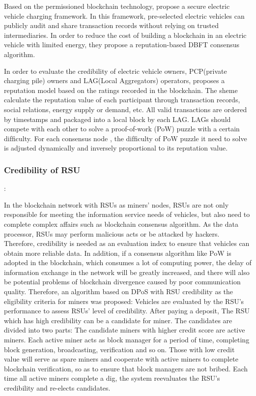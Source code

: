 Based on the permissioned blockchain technology, \cite{ref50} propose a secure electric vehicle charging framework. In this framework, pre-selected electric vehicles can publicly audit and share transaction records without relying on trusted intermediaries. In order to reduce the cost of building a blockchain in an electric vehicle with limited energy, they propose a reputation-based DBFT consensus algorithm.

In order to evaluate the credibility of electric vehicle owners, PCP(private charging pile) owners and LAG(Local Aggregators) operators, \cite{ref59} proposes a reputation model based on the ratings recorded in the blockchain. The sheme calculate the reputation value of each participant through transaction records, social relations, energy supply or demand, etc. All valid transactions are ordered by timestamps and packaged into a local block by each LAG. LAGs should compete with each other to solve a proof-of-work (PoW) puzzle with a certain difﬁculty. For each consensus node , the difﬁculty of PoW puzzle it need to solve is adjusted dynamically and inversely proportional to its reputation value.

\subsubsection{\bf Credibility of RSU}:

In the blockchain network with RSUs as miners' nodes, RSUs are not only responsible for meeting the information service needs of vehicles, but also need to complete complex affairs such as blockchain consensus algorithm.  As the data processor, RSUs may perform malicious acts or be attacked by hackers. Therefore, credibility is needed as an evaluation index to ensure that vehicles can obtain more reliable data. In addition, if a consensus algorithm like PoW is adopted in the blockchain, which consumes a lot of computing power, the delay of information exchange in the network will be greatly increased, and there will also be potential problems of blockchain divergence caused by poor communication quality. Therefore, an algorithm based on DPoS with RSU credibility as the eligibility criteria for miners was proposed: Vehicles are evaluated by the RSU's performance to assess RSUs' level of credibility. After paying a deposit, The RSU which has high credibility can be a candidate for miner. The candidates are divided into two parts: The candidate miners with higher credit score are active miners. Each active miner acts as block manager for a period of time, completing block generation, broadcasting, verification and so on. Those with low credit value will serve as spare miners and cooperate with active miners to complete blockchain verification, so as to ensure that block managers are not bribed. Each time all active miners complete a dig, the system reevaluates the RSU's credibility and re-elects candidates.
